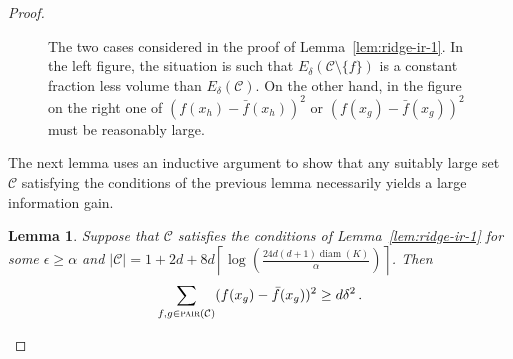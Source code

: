 \documentclass[letter, 12pt]{report}
\newcommand{\ceil}[1]{\left\lceil #1 \right\rceil}
\newcommand{\pair}{\operatorname{\textsc{pair}}}
\newcommand{\cC}{\mathcal C}
\newcommand{\diam}{\operatorname{diam}}
\newcommand{\1}{\mathbf{1}}
\theoremstyle{plain}
\newtheorem{lemma}[theorem]{Lemma}
\theoremstyle{definition}
\theoremstyle{remark}
\begin{document}
\begin{proof}
\begin{figure}[h!]
\begin{tikzpicture}[scale=0.75]
        \end{tikzpicture}

        \caption{The two cases considered in the proof of Lemma~\ref{lem:ridge-ir-1}.
            In the left figure, the situation is such that $E_\delta(\cC \setminus \{f\})$ is a constant fraction less volume than $E_\delta(\cC)$.
            On the other hand, in the figure on the right one of $(f(x_h) - \bar f(x_h))^2$ or $(f(x_g) - \bar f(x_g))^2$ must be reasonably large.}
        \label{fig:ir-ridge}
    \end{figure}

    \FloatBarrier

    The next lemma uses an inductive argument to show that any suitably large set $\cC$ satisfying the conditions of the previous lemma necessarily
    yields a large information gain.

    \begin{lemma}\label{lem:ridge-ir-2}
        Suppose that $\cC$ satisfies the conditions of Lemma~\ref{lem:ridge-ir-1} for some $\epsilon \geq \alpha$ and
        $|\cC| = 1 + 2d + 8 d \ceil{\log\left(\frac{24d(d+1) \diam(K)}{\alpha}\right)}$. Then
        \begin{align*}
            \sum_{f,g \in \pair(\cC)} (f(x_g) - \bar f(x_g))^2 \geq d \delta^2 \,.
        \end{align*}
    \end{lemma}


\end{proof}
\end{document}
